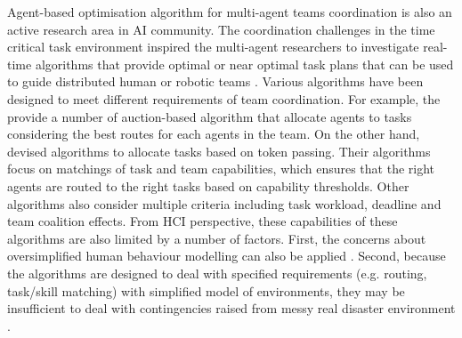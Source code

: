 
Agent-based optimisation algorithm for multi-agent teams coordination is also an active research area in \ac{AI} community. The coordination challenges in the time critical task environment inspired the multi-agent researchers to investigate real-time algorithms that provide optimal or near optimal task plans that can be used to guide distributed human or robotic teams \cite{Kitano2000}. Various algorithms have been designed to meet different requirements of team coordination. For example, the \cite{Lagoudakis2005} provide a number of auction-based algorithm that allocate agents to tasks considering the best routes for each agents in the team. On the other hand, \cite{Scerri2005a} devised algorithms to allocate tasks based on token passing. Their algorithms focus on matchings of task and team capabilities, which ensures that the right agents are routed to the right tasks based on capability thresholds. Other algorithms \cite{Ramchurn2010,Koes2005} also consider multiple criteria including task workload, deadline and team coalition effects. From \ac{HCI} perspective, these capabilities of these algorithms are also limited by a number of factors. First, the concerns about oversimplified human behaviour modelling can also be applied \cite{Drury2009}. Second, because the algorithms are designed to deal with specified requirements (e.g. routing, task/skill matching) with simplified model of environments, they may be insufficient to deal with contingencies raised from messy real disaster environment \cite{Armenakis2012}.\\

